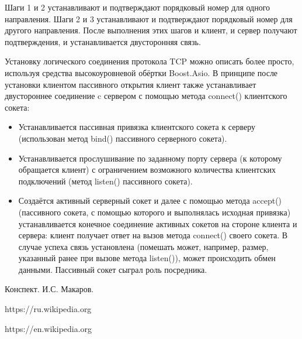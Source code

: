 \documentclass[a4paper,12pt]{article}	%
\begin{document}
	Шаги 1 и 2 устанавливают и подтверждают порядковый номер для одного направления. Шаги 2 и 3 устанавливают и подтверждают порядковый номер для другого направления. После выполнения этих шагов и клиент, и сервер получают подтверждения, и устанавливается двусторонняя связь.

	Установку логического соединения протокола TCP можно описать более просто, используя средства высокоуровневой обёртки Boost.Asio. В принципе после установки клиентом пассивного открытия клиент также устанавливает двустороннее соединение c сервером с помощью метода connect() клиентского сокета:
	
	\begin{itemize}
	
		\item Устанавливается пассивная привязка клиентского сокета к серверу (использован метод bind() пассивного серверного сокета).
		
		\item Устанавливается прослушивание по заданному порту сервера (к которому обращается клиент) с ограничением возможного количества клиентских подключений (метод listen() пассивного сокета).
		
		\item Создаётся активный серверный сокет и далее с помощью метода accept() (пассивного сокета, с помощью которого и выполнялась исходная привязка) устанавливается конечное соединение активных сокетов на стороне клиента и сервера: клиент получает ответ на вызов метода connect() своего сокета. В случае успеха связь установлена (помешать может, например, размер, указанный ранее при вызове метода listen()), может происходить обмен данными. Пассивный сокет сыграл роль посредника.
	
	\end{itemize}


\newpage

	
 
	\begin{thebibliography}{}
	
		 Конспект. И.С. Макаров.
		
		 https://ru.wikipedia.org
		
		 https://en.wikipedia.org
		
	\end{thebibliography}
\end{document}
